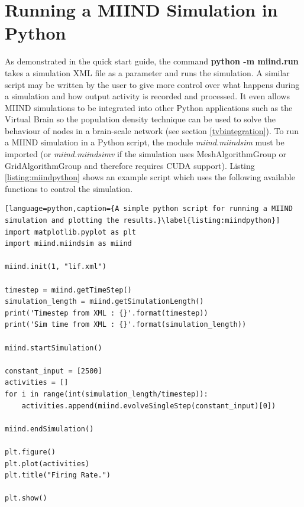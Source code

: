 \documentclass[utf8]{frontiersSCNS} %
\begin{document}
\section{Running a MIIND Simulation in Python}
\label{miindpython}
As demonstrated in the quick start guide, the command \textbf{python -m miind.run} takes a simulation XML file as a parameter and runs the simulation. A similar script may be written by the user to give more control over what happens during a simulation and how output activity is recorded and processed. It even allows MIIND simulations to be integrated into other Python applications such as the Virtual Brain \citep{sanz2013virtual} so the population density technique can be used to solve the behaviour of nodes in a brain-scale network (see section \ref{tvbintegration}). To run a MIIND simulation in a Python script, the module \textit{miind.miindsim} must be imported (or \textit{miind.miindsimv} if the simulation uses MeshAlgorithmGroup or GridAlgorithmGroup and therefore requires CUDA support). Listing \ref{listing:miindpython} shows an example script which uses the following available functions to control the simulation.\\

\begin{lstlisting}[language=python,caption={A simple python script for running a MIIND simulation and plotting the results.}\label{listing:miindpython}]
import matplotlib.pyplot as plt
import miind.miindsim as miind

miind.init(1, "lif.xml")

timestep = miind.getTimeStep()
simulation_length = miind.getSimulationLength()
print('Timestep from XML : {}'.format(timestep))
print('Sim time from XML : {}'.format(simulation_length))

miind.startSimulation()

constant_input = [2500]
activities = []
for i in range(int(simulation_length/timestep)):
    activities.append(miind.evolveSingleStep(constant_input)[0])

miind.endSimulation()

plt.figure()
plt.plot(activities)
plt.title("Firing Rate.")

plt.show()
\end{lstlisting}
\end{document}
